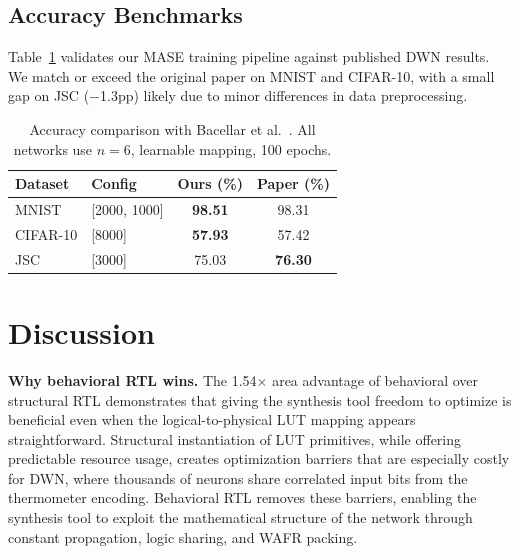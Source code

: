 \documentclass[conference]{IEEEtran}
\begin{document}
\subsection{Accuracy Benchmarks}
\label{sec:accuracy}

Table~\ref{tab:accuracy} validates our MASE training pipeline against published DWN results.
We match or exceed the original paper on MNIST and CIFAR-10, with a small gap on JSC ($-$1.3pp) likely due to minor differences in data preprocessing.

\begin{table}[t]
\centering
\caption{Accuracy comparison with Bacellar et al.~\cite{bacellar2024dwn}. All networks use $n{=}6$, learnable mapping, 100 epochs.}
\label{tab:accuracy}
\begin{tabular}{@{}llcc@{}}
\toprule
\textbf{Dataset} & \textbf{Config} & \textbf{Ours (\%)} & \textbf{Paper (\%)} \\
\midrule
MNIST    & [2000, 1000]  & \textbf{98.51} & 98.31 \\
CIFAR-10 & [8000]        & \textbf{57.93} & 57.42 \\
JSC      & [3000]        & 75.03          & \textbf{76.30} \\
\bottomrule
\end{tabular}
\end{table}


\section{Discussion}
\label{sec:discussion}

\textbf{Why behavioral RTL wins.}
The 1.54$\times$ area advantage of behavioral over structural RTL demonstrates that giving the synthesis tool freedom to optimize is beneficial even when the logical-to-physical LUT mapping appears straightforward.
Structural instantiation of LUT primitives, while offering predictable resource usage, creates optimization barriers that are especially costly for DWN, where thousands of neurons share correlated input bits from the thermometer encoding.
Behavioral RTL removes these barriers, enabling the synthesis tool to exploit the mathematical structure of the network through constant propagation, logic sharing, and WAFR packing.
\end{document}
